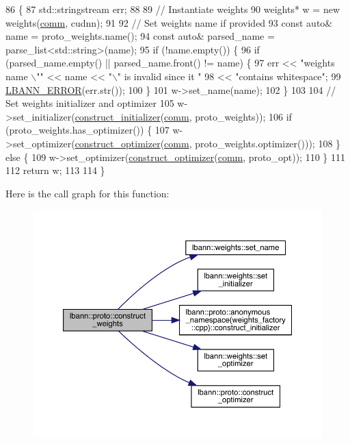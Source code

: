 \begin{DoxyCode}
86                                                                    \{
87   std::stringstream err;
88 
89   \textcolor{comment}{// Instantiate weights}
90   weights* w = \textcolor{keyword}{new} weights(\hyperlink{file__io_8cpp_ab048c6f9fcbcfaa57ce68b00263dbebe}{comm}, cudnn);
91   
92   \textcolor{comment}{// Set weights name if provided}
93   \textcolor{keyword}{const} \textcolor{keyword}{auto}& name = proto\_weights.name();
94   \textcolor{keyword}{const} \textcolor{keyword}{auto}& parsed\_name = parse\_list<std::string>(name);
95   \textcolor{keywordflow}{if} (!name.empty()) \{
96     \textcolor{keywordflow}{if} (parsed\_name.empty() || parsed\_name.front() != name) \{
97       err << \textcolor{stringliteral}{"weights name \(\backslash\)""} << name << \textcolor{stringliteral}{"\(\backslash\)" is invalid since it "}
98           << \textcolor{stringliteral}{"contains whitespace"};
99       \hyperlink{base_8hpp_a80b1d707117e968a6951b7222e4b2b87}{LBANN\_ERROR}(err.str());
100     \}
101     w->set\_name(name);
102   \}
103 
104   \textcolor{comment}{// Set weights initializer and optimizer}
105   w->set\_initializer(\hyperlink{namespacelbann_1_1proto_1_1anonymous__namespace_02weights__factory_8cpp_03_a2bbaafd93915c6f2334e16f0afcd4ee5}{construct\_initializer}(\hyperlink{file__io_8cpp_ab048c6f9fcbcfaa57ce68b00263dbebe}{comm}, proto\_weights));
106   \textcolor{keywordflow}{if} (proto\_weights.has\_optimizer()) \{
107     w->set\_optimizer(\hyperlink{namespacelbann_1_1proto_af85d2b9f1e986bbab4feccfaa19c9960}{construct\_optimizer}(\hyperlink{file__io_8cpp_ab048c6f9fcbcfaa57ce68b00263dbebe}{comm}, proto\_weights.optimizer()));
108   \} \textcolor{keywordflow}{else} \{
109     w->set\_optimizer(\hyperlink{namespacelbann_1_1proto_af85d2b9f1e986bbab4feccfaa19c9960}{construct\_optimizer}(\hyperlink{file__io_8cpp_ab048c6f9fcbcfaa57ce68b00263dbebe}{comm}, proto\_opt));
110   \}
111 
112   \textcolor{keywordflow}{return} w;
113 
114 \}
\end{DoxyCode}
Here is the call graph for this function\+:\nopagebreak
\begin{figure}[H]
\begin{center}
\leavevmode
\includegraphics[width=350pt]{namespacelbann_1_1proto_a1e95259d3e7fd20a9c361850940a398a_cgraph}
\end{center}
\end{figure}
